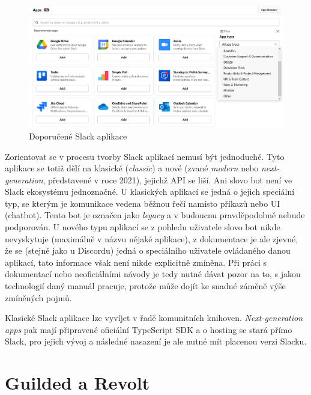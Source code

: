 \documentclass[FM]{tulthesis}
\begin{document}
	\begin{figure}[ht]
		\centering
		\includegraphics[width=\textwidth]{img/SlackApps}
		\caption{Doporučené Slack aplikace}
	\end{figure}
	
	Zorientovat se v procesu tvorby Slack aplikací nemusí být jednoduché. Tyto aplikace se totiž dělí na klasické (\textit{classic}) a nové (zvané \textit{modern} nebo \textit{next-generation}, představené v roce 2021), jejichž API se liší. Ani slovo bot není ve Slack ekosystému jednoznačné. U klasických aplikací se jedná o jejich speciální typ, se kterým je komunikace vedena běžnou řečí namísto příkazů nebo UI (chatbot). Tento bot je označen jako \textit{legacy} a v budoucnu pravděpodobně nebude podporován. U nového typu aplikací se z pohledu uživatele slovo bot nikde nevyskytuje (maximálně v názvu nějaké aplikace), z dokumentace je ale zjevné, že se (stejně jako u Discordu) jedná o speciálního uživatele ovládaného danou aplikací, tato informace však není nikde explicitně zmíněna. Při práci s dokumentací nebo neoficiálními návody je tedy nutné dávat pozor na to, s jakou technologií daný manuál pracuje, protože může dojít ke snadné záměně výše zmíněných pojmů.
	
	Klasické Slack aplikace lze vyvíjet v řadě komunitních knihoven. \textit{Next-generation apps} pak mají připravené oficiální \mbox{TypeScript} SDK a o hosting se stará přímo Slack, pro jejich vývoj a následné nasazení je ale nutné mít placenou verzi Slacku.
	
	\section{Guilded a Revolt}
	
\end{document}
